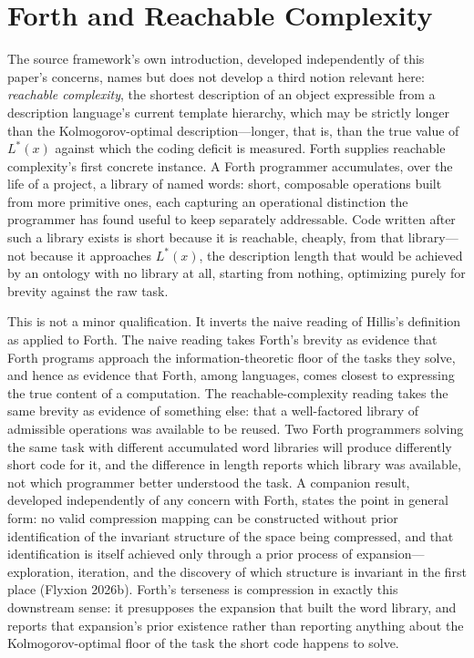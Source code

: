 \documentclass[11pt]{article}
\theoremstyle{plain}
\begin{document}
\section{Forth and Reachable Complexity}
\label{sec:forth}

The source framework's own introduction, developed independently of this paper's concerns, names but does not develop a third notion relevant here: \emph{reachable complexity}, the shortest description of an object expressible from a description language's current template hierarchy, which may be strictly longer than the Kolmogorov-optimal description---longer, that is, than the true value of $L^*(x)$ against which the coding deficit is measured. Forth supplies reachable complexity's first concrete instance. A Forth programmer accumulates, over the life of a project, a library of named words: short, composable operations built from more primitive ones, each capturing an operational distinction the programmer has found useful to keep separately addressable. Code written after such a library exists is short because it is reachable, cheaply, from that library---not because it approaches $L^*(x)$, the description length that would be achieved by an ontology with no library at all, starting from nothing, optimizing purely for brevity against the raw task.

This is not a minor qualification. It inverts the naive reading of Hillis's definition as applied to Forth. The naive reading takes Forth's brevity as evidence that Forth programs approach the information-theoretic floor of the tasks they solve, and hence as evidence that Forth, among languages, comes closest to expressing the true content of a computation. The reachable-complexity reading takes the same brevity as evidence of something else: that a well-factored library of admissible operations was available to be reused. Two Forth programmers solving the same task with different accumulated word libraries will produce differently short code for it, and the difference in length reports which library was available, not which programmer better understood the task. A companion result, developed independently of any concern with Forth, states the point in general form: no valid compression mapping can be constructed without prior identification of the invariant structure of the space being compressed, and that identification is itself achieved only through a prior process of expansion---exploration, iteration, and the discovery of which structure is invariant in the first place (Flyxion 2026b). Forth's terseness is compression in exactly this downstream sense: it presupposes the expansion that built the word library, and reports that expansion's prior existence rather than reporting anything about the Kolmogorov-optimal floor of the task the short code happens to solve.
\end{document}
